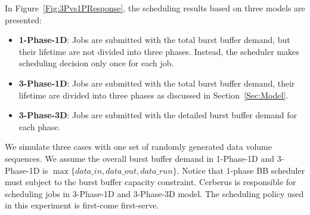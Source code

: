 In Figure~\ref{Fig:3Pvs1PResponse}, the scheduling results based on three models
are presented:
\begin{itemize}
        \item \textbf{1-Phase-1D}: Jobs are submitted with the total burst buffer demand,
        but their lifetime are not divided into three phases. 
	Instead, the scheduler makes scheduling decision only once for each job.

        \item \textbf{3-Phase-1D}: Jobs are submitted with the total burst buffer demand,
        their lifetime are divided into three phases as discussed in Section~\ref{Sec:Model}.
        
        \item \textbf{3-Phase-3D}: Jobs are submitted with the detailed burst buffer demand for each phase.
\end{itemize}
We simulate three cases with one set of randomly generated data volume sequences.
We assume the overall burst buffer demand in 1-Phase-1D and 3-Phase-1D is
$\max \{data\_in, data\_out, data\_run\}$.
Notice that 1-phase BB scheduler must subject to the burst buffer capacity constraint.
Cerberus is responsible for scheduling jobs in 3-Phase-1D and 3-Phase-3D model.
The scheduling policy used in this experiment is first-come first-serve.

% 


